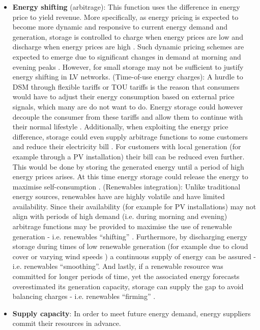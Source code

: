 \begin{itemize}
\item
\textbf{Energy shifting} (arbitrage): This function uses the difference in energy price to yield revenue.
More specifically, as energy pricing is expected to become more dynamic and responsive to current energy demand and generation, storage is controlled to charge when energy prices are low and discharge when energy prices are high \cite{Chen2009, Leou2012}.
Such dynamic pricing schemes are expected to emerge due to significant changes in demand at morning and evening peaks \cite{Koohi-Kamali2013}.
However, for small storage may not be sufficient to justify energy shifting in LV networks.
(Time-of-use energy charges): A hurdle to DSM through flexible tariffs or TOU tariffs is the reason that consumers would have to adjust their energy consumption based on external price signals, which many are do not want to do.
Energy storage could however decouple the consumer from these tariffs and allow them to continue with their normal lifestyle \cite{Khani2014}.
Additionally, when exploiting the energy price difference, storage could even supply arbitrage functions to some customers and reduce their electricity bill \cite{Nair2010a}.
For customers with local generation (for example through a PV installation) their bill can be reduced even further.
This would be done by storing the generated energy until a period of high energy prices arises.
At this time energy storage could release the energy to maximise self-consumption \cite{Luthander2016}.
(Renewables integration): Unlike traditional energy sources, renewables have are highly volatile and have limited availability.
Since their availability (for example for PV installations) may not align with periods of high demand (i.e. during morning and evening) arbitrage functions may be provided to maximise the use of renewable generation - i.e. renewables ``shifting'' \cite{Zakeri2015}.
Furthermore, by discharging energy storage during times of low renewable generation (for example due to cloud cover or varying wind speeds \cite{Jewell1987}) a continuous supply of energy can be assured - i.e. renewables ``smoothing''.
And lastly, if a renewable resource was committed for longer periods of time, yet the associated energy forecasts overestimated its generation capacity, storage can supply the gap to avoid balancing charges - i.e. renewables ``firming'' \cite{Chakraborty2012}.
\item
\textbf{Supply capacity}: In order to meet future energy demand, energy suppliers commit their resources in advance.

\end{itemize}
